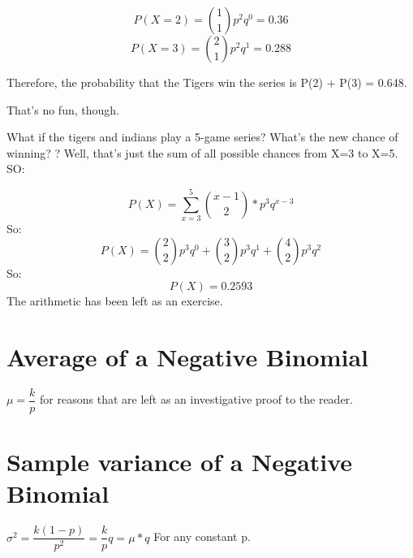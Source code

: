 \documentclass[]{article}
\begin{document}
		$$P(X=2)=\binom{1}{1}p^2 q^0 = 0.36$$
		$$P(X=3) = \binom{2}{1}p^2q^1 = 0.288$$
		
		Therefore, the probability that the Tigers win the series is P(2) + P(3) = 0.648.
		
		That's no fun, though.
		
		What if the tigers and indians play a 5-game series? What's the new chance of winning? ? Well, that's just the sum of all possible chances from X=3 to X=5. SO:
		
		$$P(X) = \sum_{x=3}^{5}\binom{x-1}{2} * p^3 q^{x-3}$$
		So: $$P(X) = \binom{2}{2}p^3 q^0 + \binom{3}{2} p^3 q^1 + \binom{4}{2} p^3 q^2$$
		So: $$P(X) = 0.2593$$
		The arithmetic has been left as an exercise.
		
	\section{Average of a Negative Binomial}
		$\mu = \dfrac{k}{p}$ for reasons that are left as an investigative proof to the reader.
		
	\section{Sample variance of a Negative Binomial}
		$\sigma^2 = \dfrac{k(1-p)}{p^2} = \dfrac{k}{p}q = \mu * q$
		For any constant p.
		
	
\end{document}
